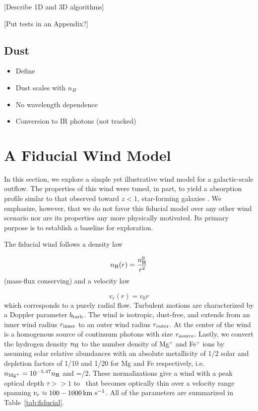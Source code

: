 \documentclass[12pt,preprint]{aastex}
\begin{document}
[Describe 1D and 3D algorithms]

[Put tests in an Appendix?]

\subsection{Dust}
\label{sec:dust_method}

\begin{itemize}
\item Define \taud
\item Dust scales with $n_H$
\item No wavelength dependence
\item Conversion to IR photons (not tracked)
\end{itemize}



\section{A Fiducial Wind Model}
\label{sec:fiducial}

In this section, we explore a simple yet illustrative wind model for
a galactic-scale outflow.  The properties of this wind were tuned, in
part, to yield a  absorption profile 
simlar to that observed toward $z<1$, star-forming galaxies
\citep{wcp+09,rubin10b}.  We emphasize, however, that we do not
favor this fiducial model over any other wind scenario nor are its
properties any more physically motivated. 
Its primary purpose is to establish a baseline for exploration.

The fiducial wind follows a density law

\begin{equation}
n_{\rm H} (r) = \frac{n^0_{\rm H}}{r^2}
\end{equation}
(mass-flux conserving) and a velocity law

\begin{equation}
v_r (r) = v_0 r
\end{equation}
which corresponds to a purely radial flow.  Turbulent motions are
characterized by a Doppler parameter $b_{\rm turb}$.  
The wind is isotropic, dust-free, and extends from an inner wind
radius $r_{\rm inner}$ to an outer wind radius $r_{\rm outer}$.  At
the center of the wind 
is a homogenous source of continuum photons with size $r_{\rm source}$.  Lastly,
we convert the hydrogen density $n_{\rm H}$ to the number density of
Mg$^+$ and Fe$^+$ ions by assuming solar relative abundances with an
absolute metallicity of 1/2 solar and depletion factors of 1/10 and
1/20 for Mg and Fe respectively, i.e.\  $n_{\rm Mg^+} = 10^{-5.47} n_{\rm H}$ 
and \nfe=\nmg/2.   
These normalizations give a wind with a peak optical depth $\tau
>> 1$ to \mgiia\ that becomes optically thin over a velocity range
spanning $v_r \approx 100 - 1000 \, {\rm km~s^{-1}}$.  
All of the parameters are summarized in Table~\ref{tab:fiducial}.  
\end{document}
